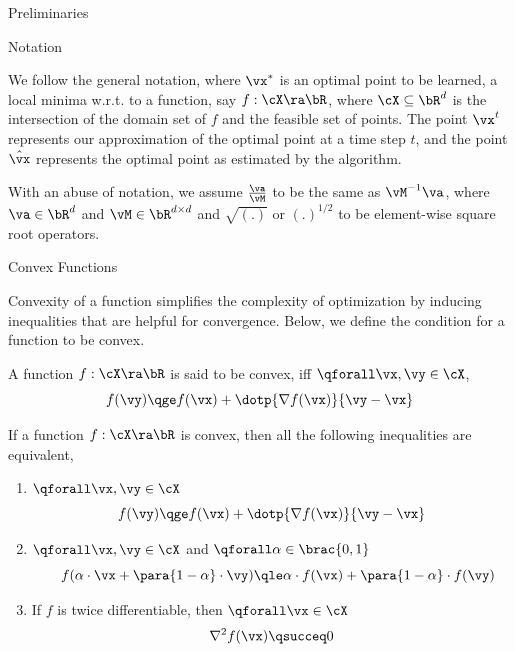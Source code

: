 \documentclass{article}
\begin{document}
\begin{psection}{Preliminaries}

	\begin{psubsection}{Notation}

		We follow the general notation, where $\xs$ is an optimal point to be learned, \ie a local minima w.r.t. to a function, say $f : \cX \ra \bR$, where $\cX \subseteq \bR^d$ is the intersection of the domain set of $f$ and the feasible set of points. The point $\x{t}$ represents our approximation of the optimal point at a time step $t$, and the point $\hat{\vx}$ represents the optimal point as estimated by the algorithm.

		With an abuse of notation, we assume $\frac{\va}{\vM}$ to be the same as $\vM^{-1} \va$, where $\va \in \bR^d$ and $\vM \in \bR^{d \times d}$ and $\sqrt{(.)}$ or $(.)^{1/2}$ to be element-wise square root operators.

	\end{psubsection}

	\begin{psubsection}{Convex Functions}

		Convexity of a function simplifies the complexity of optimization by inducing inequalities that are helpful for convergence. Below, we define the condition for a function to be convex.
		\begin{definition}
			\label{def:cvx}
			A function $f: \cX \ra \bR$ is said to be convex, iff $\qforall \vx, \vy \in \cX$,
			\begin{equation}
				f(\vy)	\qge	f(\vx) + \dotp{\nabla f(\vx)}{\vy - \vx}
				\label{eq:cvx}
			\end{equation}
		\end{definition}

		If a function $f : \cX \ra \bR$ is convex, then all the following inequalities are equivalent,

		\begin{enumerate}
			\item $\qforall \vx, \vy \in \cX$
				\begin{equation*}
					f(\vy)	\qge	f(\vx) + \dotp{\nabla f(\vx)}{\vy - \vx}
				\end{equation*}
			\item $\qforall \vx, \vy \in \cX$ and $\qforall \alpha \in \brac{0, 1}$
				\begin{equation}
					\quad f(\alpha \cdot \vx + \para{1 - \alpha} \cdot \vy)	\qle	\alpha \cdot f(\vx) + \para{1 - \alpha} \cdot f(\vy)
					\label{eq:cvx-alt}
				\end{equation}
			\item If $f$ is twice differentiable, then $\qforall \vx \in \cX$
				\begin{equation}
					\nabla^2 f(\vx)	\qsucceq 0
					\label{eq:cvx-2d}
				\end{equation}
		\end{enumerate}


\end{psubsection}
\end{psection}
\end{document}
